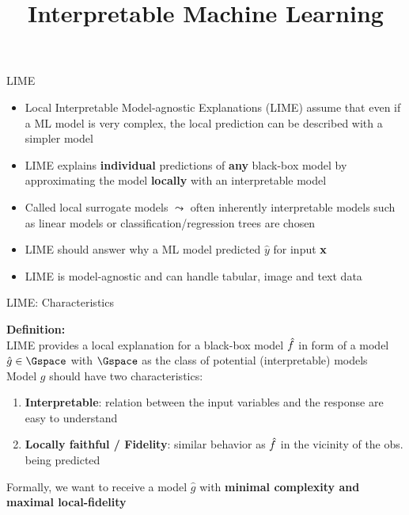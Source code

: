 \documentclass[10pt,compress,t,notes=noshow, xcolor=table]{beamer}
\title{Interpretable Machine Learning}
\date{}
\newcommand{\gh}{\hat{g}}
\begin{document}
	







\begin{frame}[c]{LIME}
\begin{itemize}
		\item Local Interpretable Model-agnostic Explanations (LIME) assume that even if a ML model is very complex, the local prediction can be described with a simpler model
		\smallskip\pause
		\item  LIME explains \textbf{individual} predictions of \textbf{any} black-box model by approximating the model \textbf{locally} with an interpretable model
		\smallskip\pause
		\item Called local surrogate models $\leadsto$ often inherently interpretable models such as linear models or classification/regression trees are chosen\\
		\smallskip\pause
		\item LIME should answer why a ML model predicted $\hat y$ for input $\mathbf{x}$
		\smallskip\pause
		\item LIME is model-agnostic and can handle tabular, image and text data 
\end{itemize}
\end{frame}


\begin{frame}[c]{LIME: Characteristics}

    \textbf{Definition:}\\
	LIME provides a local explanation for a black-box model $\hat{f}$ in form of a model $\gh \in \Gspace$ with $\Gspace$ as the class of potential (interpretable) models\\[2em]
	
	
	Model $g$ should have two characteristics:
	\begin{enumerate}
		\item \textbf{Interpretable}: relation between the input variables and the response are easy to understand  
		\item \textbf{Locally faithful / Fidelity}: similar behavior as $\hat{f}$ in the vicinity of the obs. being predicted
	\end{enumerate}
	
	\vspace{2em}
	Formally, we want to receive a model $\gh$ with \textbf{minimal complexity and maximal local-fidelity} 
\end{frame}
\end{document}
